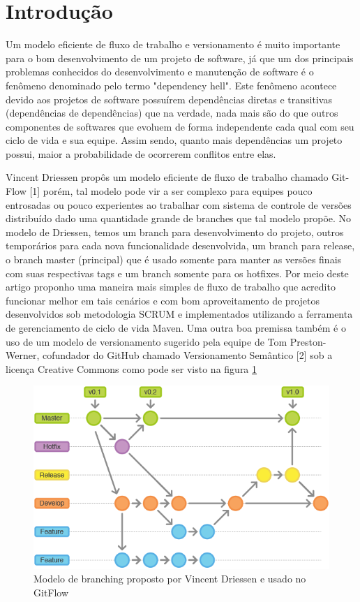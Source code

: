 \section{Introdu{\c c}{\~a}o}
\label{sec:intro}
Um modelo eficiente de fluxo de trabalho e versionamento {\'e} muito importante para o bom desenvolvimento de um projeto de software, j{\'a} que um dos principais problemas conhecidos do desenvolvimento e manuten{\c c}{\~a}o de software {\'e} o fen{\^o}meno denominado pelo termo "dependency hell". Este fen{\^o}meno acontece devido aos projetos de software possu{\'i}rem depend{\^e}ncias diretas e transitivas (depend{\^e}ncias de depend{\^e}ncias) que na verdade, nada mais s{\~a}o do que outros componentes de softwares que evoluem de forma independente cada qual com seu ciclo de vida e sua equipe. Assim sendo, quanto mais depend{\^e}ncias um projeto possui, maior a probabilidade de ocorrerem conflitos entre elas.

Vincent Driessen prop{\^o}s um modelo eficiente de fluxo de trabalho chamado Git-Flow [1] por{\'e}m, tal modelo pode vir a ser complexo para equipes pouco entrosadas ou pouco experientes ao trabalhar com sistema de controle de vers{\~o}es distribu{\'i}do dado uma quantidade grande de branches que tal modelo prop{\~o}e. No modelo de Driessen, temos um branch para desenvolvimento do projeto, outros tempor{\'a}rios para cada nova funcionalidade desenvolvida, um branch para release, o branch master (principal) que {\'e} usado somente para manter as vers{\~o}es finais com suas respectivas tags e um branch somente para os hotfixes.
Por meio deste artigo proponho uma maneira mais simples de fluxo de trabalho que acredito funcionar melhor em tais cen{\'a}rios e com bom aproveitamento de projetos desenvolvidos sob metodologia SCRUM e implementados utilizando a ferramenta de gerenciamento de ciclo de vida Maven. Uma outra boa premissa tamb{\'e}m {\'e} o uso de um modelo de versionamento sugerido pela equipe de Tom Preston-Werner, cofundador do GitHub chamado Versionamento Sem{\^a}ntico [2] sob a licen{\c c}a Creative Commons como pode ser visto na figura \ref{fig:modelogitflow}

\begin{figure}[h!]
\centering
\includegraphics[width=0.7\linewidth]{img/modelo_gitflow}
\caption[Modelo de Branching GitFlow]{Modelo de branching proposto por Vincent Driessen e usado no GitFlow}
\label{fig:modelogitflow}
\end{figure}


